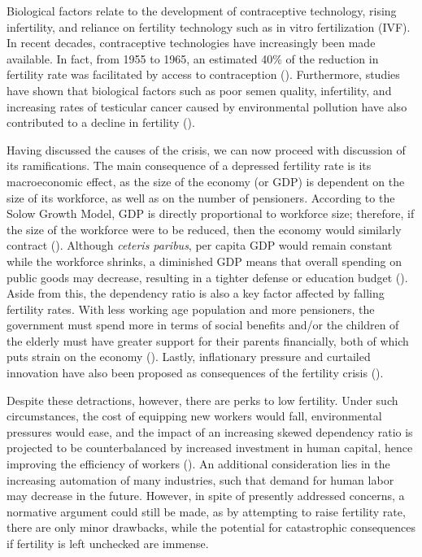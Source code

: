 Biological factors relate to the development of contraceptive technology, rising infertility, and reliance on fertility technology such as in vitro fertilization (IVF). In recent decades, contraceptive technologies have increasingly been made available. In fact, from 1955 to 1965, an estimated 40\% of the reduction in fertility rate was facilitated by access to contraception (\cite[p.\ 25]{bailey2010mommas}). Furthermore, studies have shown that biological factors such as poor semen quality, infertility, and increasing rates of testicular cancer caused by environmental pollution have also contributed to a decline in fertility (\cite{skakkebaek2022environmental}).  

Having discussed the causes of the crisis, we can now proceed with discussion of its ramifications. The main consequence of a depressed fertility rate is its macroeconomic effect, as the size of the economy (or GDP) is dependent on the size of its workforce, as well as on the number of pensioners. According to the Solow Growth Model, GDP is directly proportional to workforce size; therefore, if the size of the workforce were to be reduced, then the economy would similarly contract (\cite{solow1956contribution}). Although \emph{ceteris paribus}, per capita GDP would remain constant while the workforce shrinks, a diminished GDP means that overall spending on public goods may decrease, resulting in a tighter defense or education budget (\cite[p.\ 88]{kearney2023causes}). Aside from this, the dependency ratio is also a key factor affected by falling fertility rates. With less working age population and more pensioners, the government must spend more in terms of social benefits and/or the children of the elderly must have greater support for their parents financially, both of which puts strain on the economy (\cite[pp.\ 91–92]{kearney2023causes}). Lastly, inflationary pressure and curtailed innovation have also been proposed as consequences of the fertility crisis (\cites{jones2022end}[p.\ 18]{kohler2006low}).

Despite these detractions, however, there are perks to low fertility. Under such circumstances, the cost of equipping new workers would fall, environmental pressures would ease, and the impact of an increasing skewed dependency ratio is projected to be counterbalanced by increased investment in human capital, hence improving the efficiency of workers (\cites[p.\ 3]{jarzebski2021ageing}{lee2010fertility}[p.\ 7]{lee2014low}). An additional consideration lies in the increasing automation of many industries, such that demand for human labor may decrease in the future. However, in spite of presently addressed concerns, a normative argument could still be made, as by attempting to raise fertility rate, there are only minor drawbacks, while the potential for catastrophic consequences if fertility is left unchecked are immense. 

